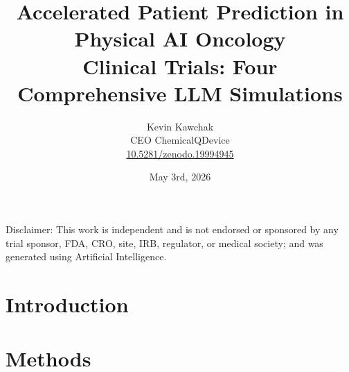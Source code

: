 \documentclass[11pt]{article}
\title{Accelerated Patient Prediction in Physical AI Oncology\\
Clinical Trials: Four Comprehensive LLM Simulations}
\author{
  Kevin Kawchak\hspace{2pt}\orcidicon{0009-0007-5457-8667} \\
  CEO ChemicalQDevice\\
  \href{https://doi.org/10.5281/zenodo.19994945}{10.5281/zenodo.19994945} \\
}
\date{May 3rd, 2026}
\begin{document}
\maketitle

\begin{abstract}

\end{abstract}

\begin{center}
\footnotesize
Disclaimer: This work is independent and is not endorsed or sponsored by any
trial sponsor, FDA, CRO, site, IRB, regulator, or medical society; and was
generated using Artificial Intelligence.
\end{center}


\vspace{-0.2cm}

\section{Introduction}
\label{sec:introduction}


\newpage
\tableofcontents
\newpage

\section{Methods}
\label{sec:methods}

\newpage

\end{document}
